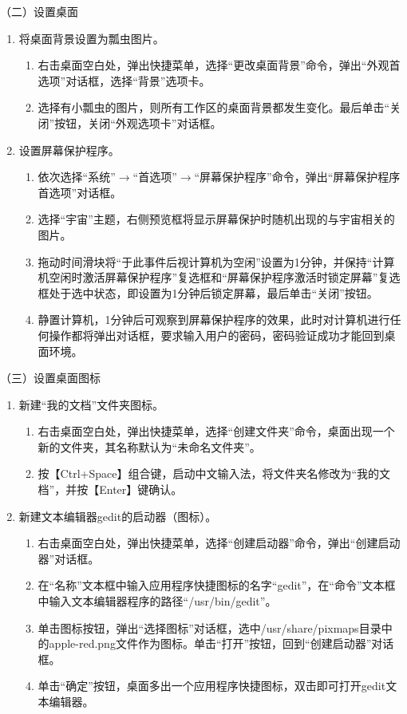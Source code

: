 \vspace{0.1in}
（二）设置桌面
\begin{enumerate}
  \item 将桌面背景设置为瓢虫图片。
    \begin{enumerate}
      \item 右击桌面空白处，弹出快捷菜单，选择“更改桌面背景”命令，弹出“外观首选项”对话框，选择“背景”选项卡。
      \item 选择有小瓢虫的图片，则所有工作区的桌面背景都发生变化。最后单击“关闭”按钮，关闭“外观选项卡”对话框。
    \end{enumerate}
  \item 设置屏幕保护程序。
    \begin{enumerate}
      \item 依次选择“系统”$\rightarrow$“首选项”$\rightarrow$“屏幕保护程序”命令，弹出“屏幕保护程序首选项”对话框。
      \item 选择“宇宙”主题，右侧预览框将显示屏幕保护时随机出现的与宇宙相关的图片。
      \item 拖动时间滑块将“于此事件后视计算机为空闲”设置为1分钟，并保持“计算机空闲时激活屏幕保护程序”复选框和“屏幕保护程序激活时锁定屏幕”复选框处于选中状态，即设置为1分钟后锁定屏幕，最后单击“关闭”按钮。
      \item 静置计算机，1分钟后可观察到屏幕保护程序的效果，此时对计算机进行任何操作都将弹出对话框，要求输入用户的密码，密码验证成功才能回到桌面环境。
    \end{enumerate}
\end{enumerate}

\vspace{0.1in}
（三）设置桌面图标
\begin{enumerate}
  \item 新建“我的文档”文件夹图标。
    \begin{enumerate}
      \item 右击桌面空白处，弹出快捷菜单，选择“创建文件夹”命令，桌面出现一个新的文件夹，其名称默认为“未命名文件夹”。
      \item 按【Ctrl+Space】组合键，启动中文输入法，将文件夹名修改为“我的文档”，并按【Enter】键确认。
    \end{enumerate}
  \item 新建文本编辑器gedit的启动器（图标）。
    \begin{enumerate}
      \item 右击桌面空白处，弹出快捷菜单，选择“创建启动器”命令，弹出“创建启动器”对话框。
      \item 在“名称”文本框中输入应用程序快捷图标的名字“gedit”，在“命令”文本框中输入文本编辑器程序的路径“/usr/bin/gedit”。
      \item 单击图标按钮，弹出“选择图标”对话框，选中/usr/share/pixmaps目录中的apple-red.png文件作为图标。单击“打开”按钮，回到“创建启动器”对话框。
      \item 单击“确定”按钮，桌面多出一个应用程序快捷图标，双击即可打开gedit文本编辑器。
    \end{enumerate}
\end{enumerate}

